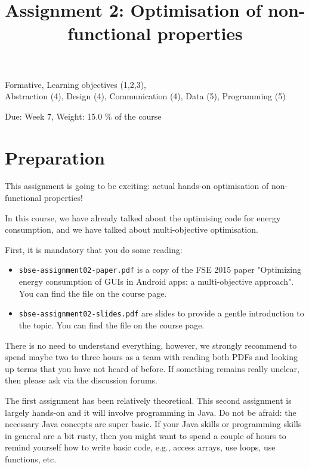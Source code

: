 \documentclass{pracs}
\newcommand{\duedate}{Week 7}
\begin{document}
\title{Assignment 2: Optimisation of non-functional properties}
\maketitle
\thispagestyle{fancy}


	Formative, 	Learning objectives (1,2,3),\\
 	Abstraction (4), 	Design (4), 	Communication (4), 	Data (5),	Programming (5)


\begin{center}
Due: \duedate, Weight: 15.0 \% of the course
\end{center}

\sloppy

\section*{Preparation}

This assignment is going to be exciting: actual hands-on optimisation of non-functional properties!

In this course, we have already talked about the optimising code for energy consumption, and we have talked about multi-objective optimisation.

First, it is mandatory that you do some reading: 

\begin{itemize}
\item \texttt{sbse-assignment02-paper.pdf} is a copy of the FSE 2015 paper "Optimizing energy consumption of GUIs in Android apps: a multi-objective approach". You can find the file on the course page. %
\item \texttt{sbse-assignment02-slides.pdf} are slides to provide a gentle introduction to the topic. You can find the file on the course page. %
\end{itemize}

There is no need to understand everything, however, we strongly recommend to spend maybe two to three hours as a team with reading both PDFs and looking up terms that you have not heard of before. If something remains really unclear, then please ask via the discussion forums. 

The first assignment has been relatively theoretical. This second assignment is largely hands-on and it will involve programming in Java. Do not be afraid: the necessary Java concepts are super basic. If your Java skills or programming skills in general are a bit rusty, then you might want to spend a couple of hours to remind yourself how to write basic code, e.g., access arrays, use loops, use functions, etc.
\end{document}
